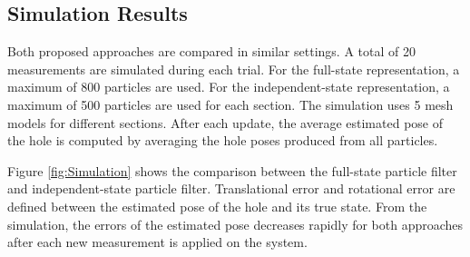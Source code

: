 \documentclass[../thesis.tex]{subfiles}
\begin{document}
\subsection{Simulation Results}

Both proposed approaches are compared in similar settings.
A total of 20 measurements are simulated during each trial. 
For the full-state representation, a maximum of 800 particles are used. For the independent-state representation, a maximum of 500 particles are used for each section.
The simulation uses 5 mesh models for different sections. 
After each update, the average estimated pose of the hole is computed by averaging the hole poses produced from all particles. 

Figure \ref{fig:Simulation} shows the comparison between the full-state particle filter and independent-state particle filter. 
Translational error and rotational error are defined between the estimated pose of the hole and its true state. 
From the simulation, the errors of the estimated pose decreases rapidly for both approaches after each new measurement is applied on the system. 
\end{document}
